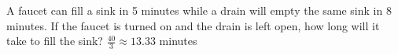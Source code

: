 {A faucet can fill a sink in 5 minutes while a drain will empty the same sink in 8 minutes.  If the faucet is turned on and the drain is left open, how long will it take to fill the sink?}
{$\frac{40}{3} \approx 13.33$ minutes}